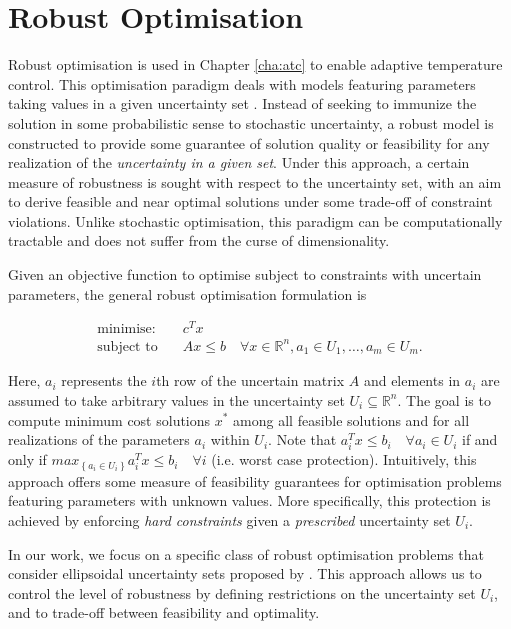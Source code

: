 \section{Robust Optimisation} \label{sec:atc:robust_opt:concept}

Robust optimisation is used in Chapter \ref{cha:atc} to enable adaptive temperature control. 
This optimisation paradigm deals with models featuring parameters taking values in a given uncertainty set \citep{bertsimas2011theory}. 
Instead of seeking to immunize the solution in some probabilistic sense to stochastic uncertainty, a robust model is constructed to provide some guarantee of solution quality or feasibility for any realization of the \textsl{uncertainty in a given set}. Under this approach, a certain measure of robustness is sought with respect to the uncertainty set, with an aim to derive feasible and near optimal solutions under some trade-off of constraint violations. Unlike stochastic optimisation, this paradigm can be computationally tractable and does not suffer from the curse of dimensionality. 

\newpage
Given an objective function to optimise subject to constraints with uncertain parameters, the general robust optimisation formulation \citep{bertsimas2011theory} is 

\begingroup
\begin{align*}
\mbox{minimise:} \quad &c^Tx	\\
\mbox{subject to} \quad &Ax \leq b \quad \forall x \in \mathbb{R}^n, a_1 \in U_1, \ldots, a_m \in U_m.
\end{align*}
\endgroup

\noindent Here, $a_i$ represents the $i$th row of the uncertain matrix $A$ and elements in $a_i$ are assumed to take arbitrary values in the uncertainty set $U_i \subseteq \mathbb{R}^n$. The goal is to compute minimum cost solutions $x^\ast$ among all feasible solutions and for all realizations of the parameters $a_i$ within $U_i$. Note that $a^T_i x \leq b_i \quad \forall a_i \in U_i$ if and only if $max_{\left\{a_i \in U_i\right\}} a_i^Tx \leq b_i \quad \forall i$ (i.e. worst case protection). Intuitively, this approach offers some measure of feasibility guarantees for optimisation problems featuring parameters with unknown values. More specifically, this protection is achieved by enforcing \textsl{hard constraints} given a \textsl{prescribed} uncertainty set $U_i$. 

In our work, we focus on a specific class of robust optimisation problems that consider ellipsoidal uncertainty sets proposed by \cite{BenT99,ben2000robust}. This approach allows us to control the level of robustness by defining restrictions on the uncertainty set $U_i$, and to trade-off between feasibility and optimality. %


